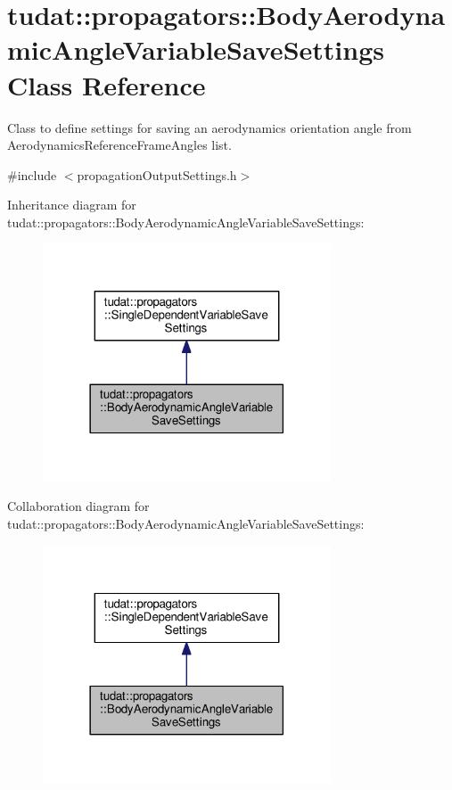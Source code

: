 \hypertarget{classtudat_1_1propagators_1_1BodyAerodynamicAngleVariableSaveSettings}{}\section{tudat\+:\+:propagators\+:\+:Body\+Aerodynamic\+Angle\+Variable\+Save\+Settings Class Reference}
\label{classtudat_1_1propagators_1_1BodyAerodynamicAngleVariableSaveSettings}


Class to define settings for saving an aerodynamics orientation angle from Aerodynamics\+Reference\+Frame\+Angles list.  




{\ttfamily \#include $<$propagation\+Output\+Settings.\+h$>$}



Inheritance diagram for tudat\+:\+:propagators\+:\+:Body\+Aerodynamic\+Angle\+Variable\+Save\+Settings\+:
\nopagebreak
\begin{figure}[H]
\begin{center}
\leavevmode
\includegraphics[width=242pt]{classtudat_1_1propagators_1_1BodyAerodynamicAngleVariableSaveSettings__inherit__graph}
\end{center}
\end{figure}


Collaboration diagram for tudat\+:\+:propagators\+:\+:Body\+Aerodynamic\+Angle\+Variable\+Save\+Settings\+:
\nopagebreak
\begin{figure}[H]
\begin{center}
\leavevmode
\includegraphics[width=242pt]{classtudat_1_1propagators_1_1BodyAerodynamicAngleVariableSaveSettings__coll__graph}
\end{center}
\end{figure}
